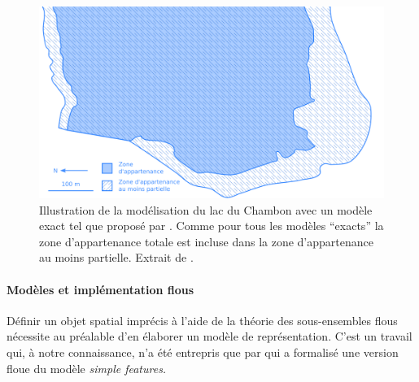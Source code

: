 \begin{figure}
  \centering
  \includegraphics{../figures/fig7.png}
  \caption{Illustration de la modélisation du lac du Chambon avec un
    modèle exact tel que proposé par \textcite{Bejaoui2009}. Comme
    pour tous les modèles \enquote{exacts} la zone d’appartenance
    totale est incluse dans la zone d’appartenance au moins
    partielle. Extrait de \textcite{Bunel2020}.}
  \label{fig:champ_exact}
\end{figure}

\paragraph{Modèles et implémentation flous}

Définir un objet spatial imprécis à l’aide de la théorie des
sous-ensembles flous nécessite au préalable d’en élaborer un modèle de
représentation. C’est un travail qui, à notre connaissance, n’a été
entrepris que par \textcite{Schneider1999,Schneider2001} qui a
formalisé une version floue du modèle \emph{simple features.}

